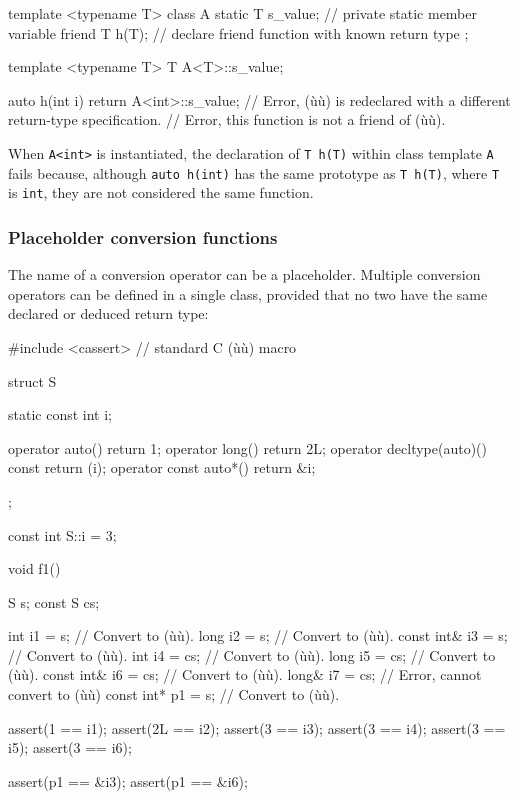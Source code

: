 \begin{emcppslisting}
template <typename T>
class A
{
    static T s_value;  // private static member variable
    friend T h(T);     // declare friend function with known return type
};

template <typename T> T A<T>::s_value;

auto h(int i)
{
    return A<int>::s_value;
        // Error, (ù{}ù) is redeclared with a different return-type specification.
        // Error, this function is not a friend of (ù{}ù).
}
\end{emcppslisting}
    

\noindent When \lstinline!A<int>! is instantiated, the declaration of
\lstinline!T!~\lstinline!h(T)! within class template \lstinline!A! fails because,
although \lstinline!auto!~\lstinline!h(int)! has the same prototype as
\lstinline!T!~\lstinline!h(T)!, where \lstinline!T! is \lstinline!int!, they are not
considered the same function.

\subsubsection[Placeholder conversion functions]{Placeholder conversion functions}\label{placeholder-conversion-functions}

The name of a conversion operator can be a placeholder. Multiple
conversion operators can be defined in a single class, provided that no
two have the same declared or deduced return type:

\begin{emcppslisting}
#include <cassert>  // standard C (ù{}ù) macro

struct S
{
    static const int i;

    operator auto() { return 1; }
    operator long() { return 2L; }
    operator decltype(auto)() const { return (i); }
    operator const auto*() { return &i; }
};

const int S::i = 3;

void f1()
{
    S       s{};
    const S cs{};

    int         i1 = s;   // Convert to (ù{}ù).
    long        i2 = s;   // Convert to (ù{}ù).
    const int&  i3 = s;   // Convert to (ù{}ù).
    int         i4 = cs;  // Convert to (ù{}ù).
    long        i5 = cs;  // Convert to (ù{}ù).
    const int&  i6 = cs;  // Convert to (ù{}ù).
    long&       i7 = cs;  // Error, cannot convert to (ù{}ù)
    const int*  p1 = s;   // Convert to (ù{}ù).

    assert(1  == i1);
    assert(2L == i2);
    assert(3  == i3);
    assert(3  == i4);
    assert(3  == i5);
    assert(3  == i6);

    assert(p1 == &i3);
    assert(p1 == &i6);
}
\end{emcppslisting}
    

